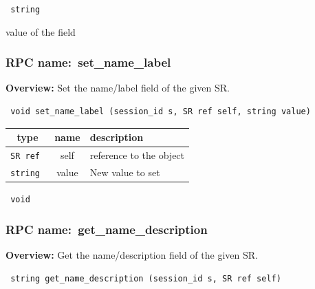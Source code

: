 \vspace{0.3cm}

{\tt 
string
}


value of the field
\vspace{0.3cm}
\vspace{0.3cm}
\vspace{0.3cm}
\subsubsection{RPC name:~set\_name\_label}

{\bf Overview:} 
Set the name/label field of the given SR.

\begin{verbatim} void set_name_label (session_id s, SR ref self, string value)\end{verbatim}



 
\vspace{0.3cm}
\begin{tabular}{|c|c|p{7cm}|}
 \hline
{\bf type} & {\bf name} & {\bf description} \\ \hline
{\tt SR ref } & self & reference to the object \\ \hline 

{\tt string } & value & New value to set \\ \hline 

\end{tabular}

\vspace{0.3cm}

{\tt 
void
}



\vspace{0.3cm}
\vspace{0.3cm}
\vspace{0.3cm}
\subsubsection{RPC name:~get\_name\_description}

{\bf Overview:} 
Get the name/description field of the given SR.

\begin{verbatim} string get_name_description (session_id s, SR ref self)\end{verbatim}


